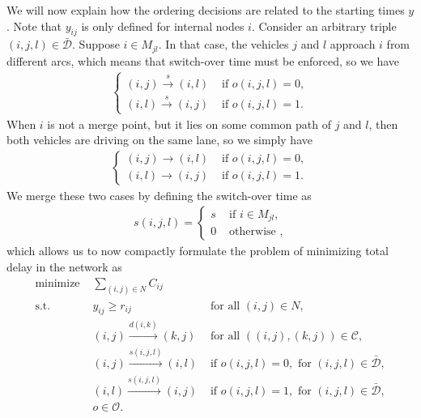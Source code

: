 \documentclass{article}
\theoremstyle{definition}
\theoremstyle{plain}
\begin{document}
We will now explain how the ordering decisions are related to the starting times $y$.
Note that $y_{ij}$ is only defined for internal nodes $i$.
Consider an arbitrary triple $(i,j,l) \in \bar{\mathcal{D}}$. Suppose
$i \in M_{jl}$. In that case, the vehicles $j$ and $l$ approach $i$ from
different arcs, which means that switch-over time must be enforced, so we have
\begin{align}
  \begin{cases}
    (i,j) \xrightarrow{s} (i,l) & \text{ if } o(i,j,l) = 0 , \\
    (i,l) \xrightarrow{s} (i,j) & \text{ if } o(i,j,l) = 1 .
  \end{cases}
\end{align}
When $i$ is not a merge point, but it lies on some common path of $j$ and $l$,
then both vehicles are driving on the same lane, so we simply have
\begin{align}
  \begin{cases}
    (i,j) \xrightarrow{} (i,l) & \text{ if } o(i,j,l) = 0 , \\
    (i,l) \xrightarrow{} (i,j) & \text{ if } o(i,j,l) = 1 .
  \end{cases}
\end{align}
We merge these two cases by defining the switch-over time as
\begin{align}
  s(i,j,l) =
  \begin{cases}
    s & \text{ if } i \in M_{jl}, \\
    0 & \text{ otherwise },
  \end{cases}
\end{align}
%
which allows us to now compactly formulate the problem of minimizing total delay
in the network as
%
\begin{subequations}
\begin{align}
  \text{minimize } & \sum_{(i,j) \in N} C_{ij} \\
  \text{s.t. } & y_{ij} \geq r_{ij} & \text{ for all } (i,j) \in N, \\
  & (i,j) \xrightarrow{d(i,k)} (k,j) & \text{ for all } ((i,j), (k,j)) \in \mathcal{C} , \label{eq:travel-constraints} \\
  & (i,j) \xrightarrow{s(i,j,l)} (i,l) & \text{ if } o(i,j,l) = 0 , \text{ for } (i,j,l) \in \bar{\mathcal{D}}, \label{eq:common-path-constraints-1} \\
  & (i,l) \xrightarrow{s(i,j,l)} (i,j) & \text{ if } o(i,j,l) = 1 , \text{ for } (i,j,l) \in \bar{\mathcal{D}}, \label{eq:common-path-constraints-2} \\
  & o \in \mathcal{O}. \label{eq:common-path-order-constraints}
\end{align}
\end{subequations}
\end{document}
